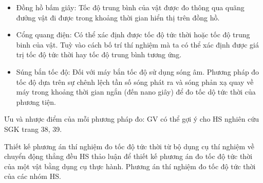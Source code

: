 {	\begin{itemize}
		\item Đồng hồ bấm giây: Tốc độ trung bình của vật được đo thông qua quãng đưởng vật đi được trong khoảng thời gian hiển thị trên đồng hồ.
		\item Cổng quang điện: Có thể xác định được tốc độ tức thời hoặc tốc độ trung binh của vật. Tuỳ vào cách bố trí thí nghiệm mà ta có thể xác định được giá trị tốc độ tức thời hay tốc độ trung bình tương ứng.
		\item Súng bắn tốc độ: Đối với máy bắn tốc độ sử dụng sóng âm. Phương pháp đo tốc độ dựa trên sự chênh lệch tần số sóng phát ra và sóng phản xạ quay về máy trong khoảng thời gian ngắn (đến nano giây) để đo tốc dộ tức thời của phương tiện.
	\end{itemize}
	Ưu và nhược điểm của mỗi phương pháp đo: GV có thể gợi ý cho HS nghiên cứu SGK trang 38, 39.
}
\hoatdong
{ Thiết kế phương án thí nghiệm đo tốc độ tức thời từ bộ dụng cụ thí nghiệm về chuyển động thẳng đều	
}
{HS thảo luận để thiết kế phương án đo tốc độ tức thời của một vật bằng dụng cụ thực hành.
	}
{Phương án thí nghiệm đo tốc độ tức thời của các nhóm HS.
}
